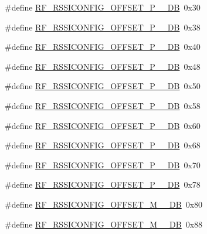 \begin{DoxyCompactItemize}
\#define \hyperlink{sx1276Regs-Fsk_8h_a71cb3712a518504dc00192bd7830d0fc}{R\+F\+\_\+\+R\+S\+S\+I\+C\+O\+N\+F\+I\+G\+\_\+\+O\+F\+F\+S\+E\+T\+\_\+\+P\+\_\+\_\+\+DB}~0x30
\item 
\#define \hyperlink{sx1276Regs-Fsk_8h_a2e7c3aaf7c9271cab8f33ffb42d016ac}{R\+F\+\_\+\+R\+S\+S\+I\+C\+O\+N\+F\+I\+G\+\_\+\+O\+F\+F\+S\+E\+T\+\_\+\+P\+\_\+\_\+\+DB}~0x38
\item 
\#define \hyperlink{sx1276Regs-Fsk_8h_a523fcb82c45be7b2f269a9c20c5063e3}{R\+F\+\_\+\+R\+S\+S\+I\+C\+O\+N\+F\+I\+G\+\_\+\+O\+F\+F\+S\+E\+T\+\_\+\+P\+\_\+\_\+\+DB}~0x40
\item 
\#define \hyperlink{sx1276Regs-Fsk_8h_a070ede192c6134e05ce21875038d2525}{R\+F\+\_\+\+R\+S\+S\+I\+C\+O\+N\+F\+I\+G\+\_\+\+O\+F\+F\+S\+E\+T\+\_\+\+P\+\_\+\_\+\+DB}~0x48
\item 
\#define \hyperlink{sx1276Regs-Fsk_8h_afbfdf21feffd708399f947db0aa2bc09}{R\+F\+\_\+\+R\+S\+S\+I\+C\+O\+N\+F\+I\+G\+\_\+\+O\+F\+F\+S\+E\+T\+\_\+\+P\+\_\+\_\+\+DB}~0x50
\item 
\#define \hyperlink{sx1276Regs-Fsk_8h_ae11e2cc321929764afe9df5c5bb750ea}{R\+F\+\_\+\+R\+S\+S\+I\+C\+O\+N\+F\+I\+G\+\_\+\+O\+F\+F\+S\+E\+T\+\_\+\+P\+\_\+\_\+\+DB}~0x58
\item 
\#define \hyperlink{sx1276Regs-Fsk_8h_abce6efdb35695bf504c61bc91edd06bd}{R\+F\+\_\+\+R\+S\+S\+I\+C\+O\+N\+F\+I\+G\+\_\+\+O\+F\+F\+S\+E\+T\+\_\+\+P\+\_\+\_\+\+DB}~0x60
\item 
\#define \hyperlink{sx1276Regs-Fsk_8h_a636e0b5757980dd446fd0f8d68ff7bec}{R\+F\+\_\+\+R\+S\+S\+I\+C\+O\+N\+F\+I\+G\+\_\+\+O\+F\+F\+S\+E\+T\+\_\+\+P\+\_\+\_\+\+DB}~0x68
\item 
\#define \hyperlink{sx1276Regs-Fsk_8h_adb4617e4a26c0967429266f47635854c}{R\+F\+\_\+\+R\+S\+S\+I\+C\+O\+N\+F\+I\+G\+\_\+\+O\+F\+F\+S\+E\+T\+\_\+\+P\+\_\+\_\+\+DB}~0x70
\item 
\#define \hyperlink{sx1276Regs-Fsk_8h_a9bc9864b2deb63ce4851767aa20d13fe}{R\+F\+\_\+\+R\+S\+S\+I\+C\+O\+N\+F\+I\+G\+\_\+\+O\+F\+F\+S\+E\+T\+\_\+\+P\+\_\+\_\+\+DB}~0x78
\item 
\#define \hyperlink{sx1276Regs-Fsk_8h_aeffccc68b7d23a19aaa8af6531d2d2ce}{R\+F\+\_\+\+R\+S\+S\+I\+C\+O\+N\+F\+I\+G\+\_\+\+O\+F\+F\+S\+E\+T\+\_\+\+M\+\_\+\_\+\+DB}~0x80
\item 
\#define \hyperlink{sx1276Regs-Fsk_8h_ad7fb49ed509ef7fb18fadda22bf06f11}{R\+F\+\_\+\+R\+S\+S\+I\+C\+O\+N\+F\+I\+G\+\_\+\+O\+F\+F\+S\+E\+T\+\_\+\+M\+\_\+\_\+\+DB}~0x88
\item 

\end{DoxyCompactItemize}
